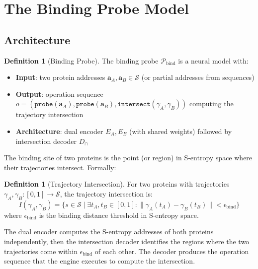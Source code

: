 \documentclass[11pt,twocolumn,a4paper]{article}
\theoremstyle{definition}
\newtheorem{definition}[theorem]{Definition}
\theoremstyle{remark}
\newcommand{\Sspace}{\mathcal{S}}
\newcommand{\addr}{\mathbf{a}}
\newcommand{\probe}{\mathcal{P}}
\begin{document}
\section{The Binding Probe Model}
\label{sec:binding_probe}

\subsection{Architecture}

\begin{definition}[Binding Probe]
\label{def:binding_probe}
The binding probe $\probe_{\text{bind}}$ is a neural model with:
\begin{itemize}
    \item \textbf{Input}: two protein addresses $\addr_A, \addr_B \in \Sspace$ (or partial addresses from sequences)
    \item \textbf{Output}: operation sequence $o = (\texttt{probe}(\addr_A), \texttt{probe}(\addr_B), \texttt{intersect}(\gamma_A, \gamma_B))$ computing the trajectory intersection
    \item \textbf{Architecture}: dual encoder $E_A, E_B$ (with shared weights) followed by intersection decoder $D_\cap$
\end{itemize}
\end{definition}

The binding site of two proteins is the point (or region) in S-entropy space where their trajectories intersect. Formally:

\begin{definition}[Trajectory Intersection]
\label{def:trajectory_intersection}
For two proteins with trajectories $\gamma_A, \gamma_B: [0,1] \to \Sspace$, the trajectory intersection is:
\begin{equation}
I(\gamma_A, \gamma_B) = \{s \in \Sspace \;|\; \exists t_A, t_B \in [0,1]: \|\gamma_A(t_A) - \gamma_B(t_B)\| < \epsilon_{\text{bind}}\}
\end{equation}
where $\epsilon_{\text{bind}}$ is the binding distance threshold in S-entropy space.
\end{definition}

The dual encoder computes the S-entropy addresses of both proteins independently, then the intersection decoder identifies the regions where the two trajectories come within $\epsilon_{\text{bind}}$ of each other. The decoder produces the operation sequence that the engine executes to compute the intersection.
\end{document}
